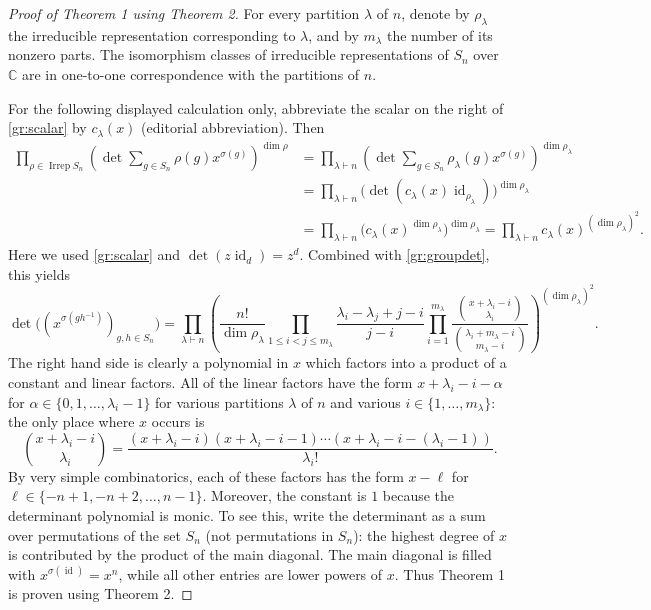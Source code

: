 \documentclass[UTF8,11pt,a4paper]{ctexart}
\theoremstyle{definition}\newtheorem*{definition}{Definition}
\theoremstyle{remark}\newtheorem*{remark}{Remark}
\DeclareMathOperator{\id}{id}
\newcommand{\C}{\mathbb C}
\begin{document}
\begin{proof}[Proof of Theorem 1 using Theorem 2]
For every partition $\lambda$ of $n$, denote by $\rho_\lambda$ the irreducible representation corresponding to $\lambda$, and by $m_\lambda$ the number of its nonzero parts. The isomorphism classes of irreducible representations of $S_n$ over $\C$ are in one-to-one correspondence with the partitions of $n$.

For the following displayed calculation only, abbreviate the scalar on the right of \eqref{gr:scalar} by $c_\lambda(x)$ (editorial abbreviation). Then
\begin{align*}
\prod_{\rho\in\operatorname{Irrep}S_n}
\left(\det\sum_{g\in S_n}\rho(g)x^{\sigma(g)}\right)^{\dim\rho}
&=\prod_{\lambda\vdash n}
\left(\det\sum_{g\in S_n}\rho_\lambda(g)x^{\sigma(g)}\right)^{\dim\rho_\lambda}\\
&=\prod_{\lambda\vdash n}\bigl(\det(c_\lambda(x)\id_{\rho_\lambda})\bigr)^{\dim\rho_\lambda}\\
&=\prod_{\lambda\vdash n}\bigl(c_\lambda(x)^{\dim\rho_\lambda}\bigr)^{\dim\rho_\lambda}
=\prod_{\lambda\vdash n}c_\lambda(x)^{(\dim\rho_\lambda)^2}.
\end{align*}
Here we used \eqref{gr:scalar} and $\det(z\id_d)=z^d$. Combined with \eqref{gr:groupdet}, this yields
\begin{equation}\label{gr:detanswer}
\det\bigl((x^{\sigma(gh^{-1})})_{g,h\in S_n}\bigr)
=\prod_{\lambda\vdash n}
\left(
\frac{n!}{\dim\rho_\lambda}
\prod_{1\le i<j\le m_\lambda}\frac{\lambda_i-\lambda_j+j-i}{j-i}
\prod_{i=1}^{m_\lambda}
\frac{\binom{x+\lambda_i-i}{\lambda_i}}
{\binom{\lambda_i+m_\lambda-i}{m_\lambda-i}}
\right)^{(\dim\rho_\lambda)^2}.
\end{equation}
The right hand side is clearly a polynomial in $x$ which factors into a product of a constant and linear factors. All of the linear factors have the form $x+\lambda_i-i-\alpha$ for $\alpha\in\{0,1,\ldots,\lambda_i-1\}$ for various partitions $\lambda$ of $n$ and various $i\in\{1,\ldots,m_\lambda\}$: the only place where $x$ occurs is
\[
\binom{x+\lambda_i-i}{\lambda_i}
=\frac{(x+\lambda_i-i)(x+\lambda_i-i-1)\cdots(x+\lambda_i-i-(\lambda_i-1))}{\lambda_i!}.
\]
By very simple combinatorics, each of these factors has the form $x-\ell$ for $\ell\in\{-n+1,-n+2,\ldots,n-1\}$. Moreover, the constant is $1$ because the determinant polynomial is monic. To see this, write the determinant as a sum over permutations of the set $S_n$ (not permutations in $S_n$): the highest degree of $x$ is contributed by the product of the main diagonal. The main diagonal is filled with $x^{\sigma(\id)}=x^n$, while all other entries are lower powers of $x$. Thus Theorem 1 is proven using Theorem 2.
\end{proof}
\end{document}
